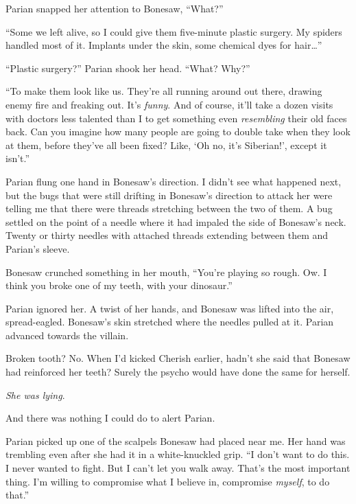 Parian snapped her attention to Bonesaw, ``What?''



``Some we left alive, so I could give them five-minute plastic surgery.  My spiders handled most of it.  Implants under the skin, some chemical dyes for hair\ldots''



``Plastic surgery?''  Parian shook her head.  ``What?  Why?''



``To make them look like us.  They're all running around out there, drawing enemy fire and freaking out.  It's \emph{funny}.  And of course, it'll take a dozen visits with doctors less talented than I to get something even \emph{resembling} their old faces back.  Can you imagine how many people are going to double take when they look at them, before they've all been fixed?  Like, `Oh no, it's Siberian!', except it isn't.''



Parian flung one hand in Bonesaw's direction.  I didn't see what happened next, but the bugs that were still drifting in Bonesaw's direction to attack her were telling me that there were threads stretching between the two of them.  A bug settled on the point of a needle where it had impaled the side of Bonesaw's neck.  Twenty or thirty needles with attached threads extending between them and Parian's sleeve.



Bonesaw crunched something in her mouth, ``You're playing so rough.  Ow.  I think you broke one of my teeth, with your dinosaur.''



Parian ignored her.  A twist of her hands, and Bonesaw was lifted into the air, spread-eagled.  Bonesaw's skin stretched where the needles pulled at it.  Parian advanced towards the villain.



Broken tooth?  No.  When I'd kicked Cherish earlier, hadn't she said that Bonesaw had reinforced her teeth?  Surely the psycho would have done the same for herself.



\emph{She was lying}.



And there was nothing I could do to alert Parian.



Parian picked up one of the scalpels Bonesaw had placed near me.  Her hand was trembling even after she had it in a white-knuckled grip.  ``I don't want to do this.  I never wanted to fight.  But I can't let you walk away.  That's the most important thing.  I'm willing to compromise what I believe in, compromise \emph{myself}, to do that.''



